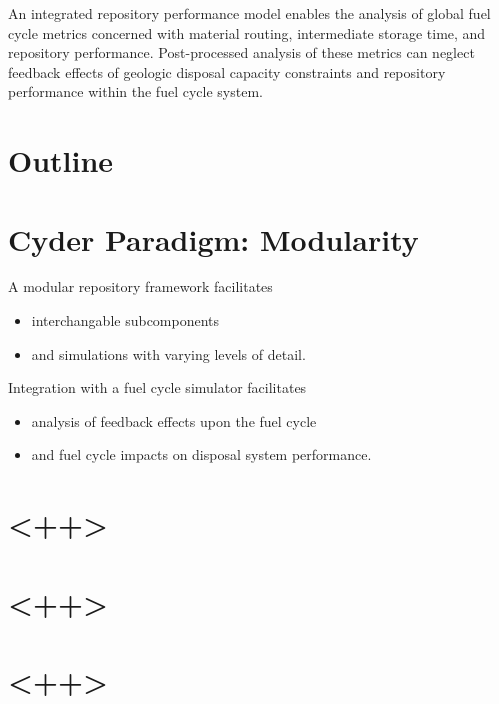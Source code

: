 \documentclass[letterpaper]{article}
\begin{document}
An integrated repository performance model enables the analysis of global fuel
cycle metrics concerned with material routing, intermediate storage time, and
repository performance. Post-processed analysis of these metrics can neglect
feedback effects of geologic disposal capacity constraints and repository
performance within the fuel cycle system.


\section*{Outline}



\section*{Cyder Paradigm: Modularity}
A modular repository framework facilitates
\begin{itemize}
\item interchangable subcomponents
\item and simulations with varying levels of detail.
\end{itemize}
Integration with a fuel cycle simulator facilitates
\begin{itemize}
\item analysis of feedback effects upon the fuel cycle
\item and fuel cycle impacts on disposal system performance.
\end{itemize}

\section*{<++>}
\section*{<++>}
\section*{<++>}


\pagebreak


\end{document}
